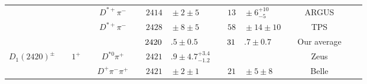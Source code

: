 \begin{adjustbox}{width=0.76\textwidth,center}
{\begin{tabular}{cp{5pt}cp{5pt}cp{5pt}r@{}lp{5pt}r@{}lp{5pt}cp{5pt}c}
		                                         &                  &                              &                  & $D^{*+}\pi^{-}$                 &                       & $	2414$                       & ${}\pm2\pm5	$                                 &                       & $	13$                                            & ${}\pm6^{+10}_{-5}	$                         &                       & ARGUS                                                         &                       & \cite{Albrecht:1989pa}                    \\
		                                         &                  &                              &                  & $D^{*+}\pi^{-}$                 &                       & $	2428$                       & ${} \pm 8 \pm5	$                              &                       & $	58$                                            & ${}\pm14 \pm10	$                             &                       & TPS                                                           &                       & \cite{Anjos:1988uf}                       \\ \cmidrule{6-14}
		                                         &                  &                              &                  &                                 & \cellcolor{Gray}      & $	\cellcolor{Gray} 2420$      & \cellcolor{Gray}$.5 \pm 0.5	$                 & \cellcolor{Gray}      & $	\cellcolor{Gray} 31$                           & \cellcolor{Gray}$.7 \pm 0.7	$                & \cellcolor{Gray}      & \cellcolor{Gray} Our average                                  & \cellcolor{Gray}      &                                           \\ \midrule
		\multirow{5}{*}{$D_{1}^{}(2420)^{\pm}$}  &                  & \multirow{5}{*}{$1^{+}$}     &                  & $D^{*0}\pi^{+}$                 &                       & $	2421$                       & $.9\pm4.7^{+3.4}_{-1.2}	$                     &                       &                                                  &                                              &                       & Zeus                                                          &                       & \cite{Abramowicz:2012ys}                  \\
		                                         &                  &                              &                  & $D^{+}\pi^{-}\pi^{+}$           &                       & $	2421$                       & ${}\pm2\pm1	$                                 &                       & $	21$                                            & ${}\pm5\pm8	$                                &                       & Belle                                                         &                       & \cite{Abe:2004sm}                         \\

\end{tabular}}
\end{adjustbox}

